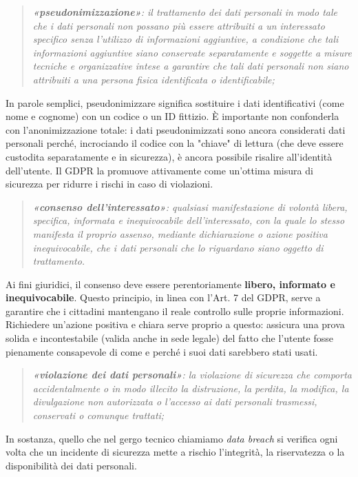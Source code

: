 \begin{quote}
    \textit{\textbf{«pseudonimizzazione»}: il trattamento dei dati personali in modo tale che i dati personali non possano più essere attribuiti a un interessato specifico senza l'utilizzo di informazioni aggiuntive, a condizione che tali informazioni aggiuntive siano conservate separatamente e soggette a misure tecniche e organizzative intese a garantire che tali dati personali non siano attribuiti a una persona fisica identificata o identificabile;
}\end{quote}
In parole semplici, pseudonimizzare significa sostituire i dati identificativi (come nome e cognome) con un codice o un ID fittizio. È importante non confonderla con l'anonimizzazione totale: i dati pseudonimizzati sono ancora considerati dati personali perché, incrociando il codice con la "chiave" di lettura (che deve essere custodita separatamente e in sicurezza), è ancora possibile risalire all'identità dell'utente. Il GDPR la promuove attivamente come un'ottima misura di sicurezza per ridurre i rischi in caso di violazioni.  

\begin{quote}
    \textit{\textbf{«consenso dell'interessato»}: qualsiasi manifestazione di volontà libera, specifica, informata e inequivocabile dell'interessato, con la quale lo stesso manifesta il proprio assenso, mediante dichiarazione o azione positiva inequivocabile, che i dati personali che lo riguardano siano oggetto di trattamento.
}
\end{quote}
Ai fini giuridici, il consenso deve essere perentoriamente \textbf{libero, informato e inequivocabile}. Questo principio, in linea con l'Art. 7 del GDPR, serve a garantire che i cittadini mantengano il reale controllo sulle proprie informazioni. Richiedere un'azione positiva e chiara serve proprio a questo: assicura una prova solida e incontestabile (valida anche in sede legale) del fatto che l'utente fosse pienamente consapevole di come e perché i suoi dati sarebbero stati usati.  

\begin{quote}
    \textit{\textbf{«violazione dei dati personali»}: la violazione di sicurezza che comporta accidentalmente o in modo illecito la distruzione, la perdita, la modifica, la divulgazione non autorizzata o l'accesso ai dati personali trasmessi, conservati o comunque trattati;}
\end{quote}

In sostanza, quello che nel gergo tecnico chiamiamo \textit{data breach} si verifica ogni volta che un incidente di sicurezza mette a rischio l'integrità, la riservatezza o la disponibilità dei dati personali.

